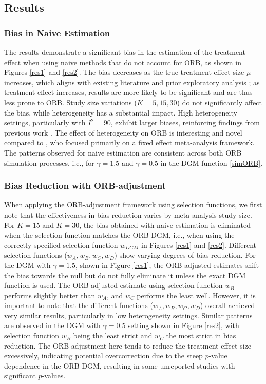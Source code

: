 \documentclass[twocolumn]{article}\usepackage[]{graphicx}\usepackage[]{xcolor}
\begin{document}
\subsection{Results} \label{3.2}

\subsubsection{Bias in Naive Estimation}
The results demonstrate a significant bias in the estimation of the treatment effect when using naive methods that do not account for ORB, as shown in Figures \ref{res1} and \ref{res2}. The bias decreases as the true treatment effect size $\mu$ increases, which aligns with existing literature \citep{Copas2019, Bay, dutch} and prior exploratory analysis \citep{mythesis}; as treatment effect increases, results are more likely to be significant and are thus less prone to ORB. Study size variations ($K=5, 15, 30$) do not significantly affect the bias, while heterogeneity has a substantial impact. High heterogeneity settings, particularly with $I^2=90$, exhibit larger biases, reinforcing findings from previous work \citep{mythesis}. The effect of heterogeneity on ORB is interesting and novel compared to \citet{Copas2019}, who focused primarily on a fixed effect meta-analysis framework. The patterns observed for naive estimation are consistent across both ORB simulation processes, i.e., for $\gamma=1.5$ and $\gamma=0.5$ in the DGM function \eqref{simORB}.

\subsubsection{Bias Reduction with ORB-adjustment}
When applying the ORB-adjustment framework using selection functions, we first note that the effectiveness in bias reduction varies by meta-analysis study size. For $K=15$ and $K=30$, the bias obtained with naive estimation is eliminated when the selection function matches the ORB DGM, i.e., when using the correctly specified selection function $w_{DGM}$ in Figures \ref{res1} and \ref{res2}. Different selection functions ($w_A, w_B, w_C, w_D$) show varying degrees of bias reduction. For the DGM with $\gamma=1.5$, shown in Figure \ref{res1}, the ORB-adjusted estimates shift the bias towards the null but do not fully eliminate it unless the exact DGM function is used. The ORB-adjusted estimate using selection function $w_B$ performs slightly better than $w_A$, and $w_C$ performs the least well. However, it is important to note that the different functions ($w_A, w_B, w_C, w_D$) overall achieved very similar results, particularly in low heterogeneity settings. Similar patterns are observed in the DGM with $\gamma=0.5$ setting shown in Figure \ref{res2}, with selection function $w_B$ being the least strict and $w_C$ the most strict in bias reduction. The ORB-adjustment here tends to reduce the treatment effect size excessively, indicating potential overcorrection due to the steep $p$-value dependence in the ORB DGM, resulting in some unreported studies with significant $p$-values. 
\end{document}
